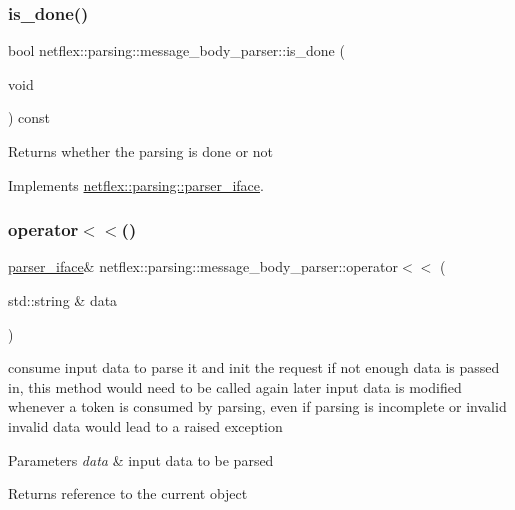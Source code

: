 \subsubsection{\texorpdfstring{is\+\_\+done()}{is\_done()}}
{\footnotesize\ttfamily bool netflex\+::parsing\+::message\+\_\+body\+\_\+parser\+::is\+\_\+done (\begin{DoxyParamCaption}\item[{void}]{ }\end{DoxyParamCaption}) const\hspace{0.3cm}{\ttfamily [virtual]}}

\begin{DoxyReturn}{Returns}
whether the parsing is done or not 
\end{DoxyReturn}


Implements \hyperlink{classnetflex_1_1parsing_1_1parser__iface_afebd1cc50d5958f712dfac0c023fd162}{netflex\+::parsing\+::parser\+\_\+iface}.

\mbox{\label{classnetflex_1_1parsing_1_1message__body__parser_a891c157d04d1fc59c1524672c4574570}} 
\subsubsection{\texorpdfstring{operator$<$$<$()}{operator<<()}}
{\footnotesize\ttfamily \hyperlink{classnetflex_1_1parsing_1_1parser__iface}{parser\+\_\+iface}\& netflex\+::parsing\+::message\+\_\+body\+\_\+parser\+::operator$<$$<$ (\begin{DoxyParamCaption}\item[{std\+::string \&}]{data }\end{DoxyParamCaption})\hspace{0.3cm}{\ttfamily [virtual]}}

consume input data to parse it and init the request if not enough data is passed in, this method would need to be called again later input data is modified whenever a token is consumed by parsing, even if parsing is incomplete or invalid invalid data would lead to a raised exception


\begin{DoxyParams}{Parameters}
{\em data} & input data to be parsed \\
\hline
\end{DoxyParams}
\begin{DoxyReturn}{Returns}
reference to the current object 
\end{DoxyReturn}


